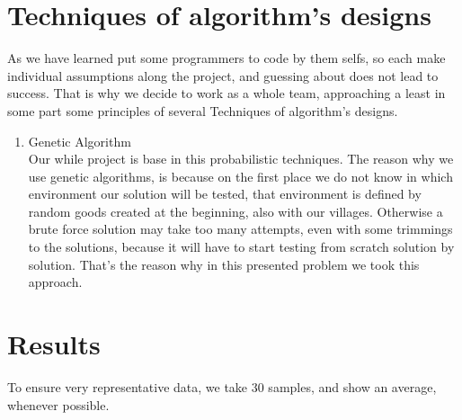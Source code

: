 \documentclass[twocolumn]{IEEEtran}
\begin{document}
\section{Techniques of algorithm's designs}

	As we have learned put some programmers to code by them selfs, so each make individual assumptions along  the project, and guessing about does not lead to success. That is why we decide to work as a whole team, approaching a least in some part some principles of several Techniques of algorithm's designs.
\begin{enumerate}
	\item Genetic Algorithm \\
    Our while project is base in this probabilistic techniques. The reason why we use genetic algorithms, is because on the first place we do not know in which environment our solution will be tested, that environment is defined by random goods created at the beginning, also with our villages. Otherwise a brute force solution may take too many attempts, even with some trimmings to the solutions, because it will have to start testing from scratch solution by solution. That's the reason why in this presented problem we took this approach. \cite{29}


\end{enumerate}

\section{Results}

To ensure very representative data, we take 30 samples, and show an average, whenever possible.\cite{26} \cite{27}\\
\end{document}
